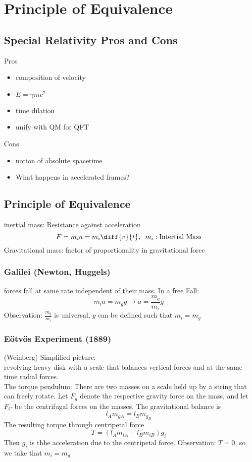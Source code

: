 \chapter{Principle of Equivalence}

\section{Special Relativity Pros and Cons}

Pros
\begin{itemize}
	\item composition of velocity
	\item $E=\gamma mc^2$
	\item time dilation
	\item unify with QM for QFT
\end{itemize}
Cons
\begin{itemize}
	\item notion of absolute spacetime
	\item What happens in accelerated frames?
\end{itemize}

\section{Principle of Equivalence}
inertial mass: Resistance against acceleration
\begin{equation}
	F = m_i a  = m_i \diff{v}{t}, \;\; m_i: \text{Intertial Mass}
\end{equation}
Gravitational mass: factor of proportionality in gravitational force

\subsection{Galilei (Newton, Huggels)}
forces fall at same rate independent of their mass. In a free Fall:
\begin{equation}
	m_i a = m_g g \rightarrow a = \frac{m_g}{m_i}g
\end{equation}
Observation: $\frac{m_g}{m_i}$ is universal, $g$ can be defined such that $m_i = m_g$

\subsection{Eötvös Experiment (1889)}
(Weinberg)
Simplified picture:\\
revolving heavy disk with a scale that balances vertical forces and at the same time radial forces.\\
The torque pendulum: There are two masses on a scale held up by a string that can freely rotate. Let $F_g$ denote the respective gravity force on the mass, and let $F_C$ be the centrifugal forces on the masses. The gravitational balance is
\begin{equation}
	l_A m_{gA} = l_B m_{g_B}
\end{equation}
The resulting torque through centripetal force
\begin{equation}
	T = (l_A m_{iA} - l_B m_{iB})g_i
\end{equation}
Then $g_i$ is thhe acceleration due to the centripetal force. Observation: $T=0$, so we take that $m_i = m_g$

